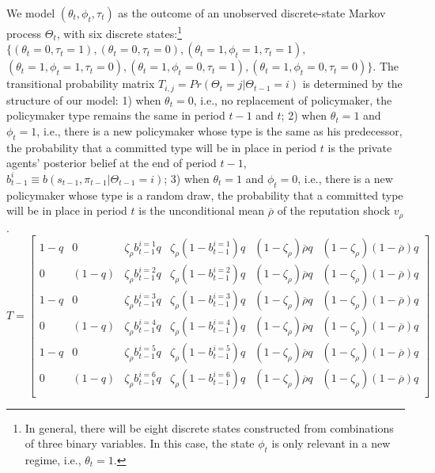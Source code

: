 \documentclass[12pt,letter,leqno]{article}
\theoremstyle{asn}
\theoremstyle{lem}
\theoremstyle{slem}
\theoremstyle{prop}
\theoremstyle{appprop}
\theoremstyle{rem}
\theoremstyle{defn}
\begin{document}
We model $(\theta_t,\phi_t,\tau_t)$ as the outcome of an unobserved discrete-state Markov process $\Theta_{t}$, with six discrete states:\footnote{In general, there will be eight discrete states constructed from combinations of three binary variables. In this case, the state $\phi_t$ is only relevant in a new regime, i.e., $\theta_t=1$.} $\{(\theta_t=0,\tau_t=1), (\theta_t=0,\tau_t=0), (\theta_t=1,\phi_t=1,\tau_t=1),$
$(\theta_t=1,\phi_t=1,\tau_t=0),(\theta_t=1,\phi_t=0,\tau_t=1),(\theta_t=1,\phi_t=0,\tau_t=0)\}$. The transitional probability matrix $T_{i,j} = Pr(\Theta_t=j|\Theta_{t-1}=i)$ is determined by the structure of our model: 1) when $\theta_t=0$, i.e., no replacement of policymaker, the policymaker type remains the same in period $t-1$ and $t$; 2) when $\theta_t=1$ and $\phi_t=1$, i.e., there is a new policymaker whose type is the same as his predecessor, the probability that a committed type will be in place in period $t$ is the private agents' posterior belief at the end of period $t-1$, $b_{t-1}^{i}\equiv b(s_{t-1},\pi_{t-1}|\Theta_{t-1}=i)$; 3) when $\theta_t=1$ and $\phi_t=0$, i.e., there is a new policymaker whose type is a random draw, the probability that a committed type will be in place in period $t$ is the unconditional mean $\overline{\rho}$ of the reputation shock $v_{\rho}$. 
\begin{equation}\label{app:transmatrix}
T=
\begin{bmatrix}
1-q & 0 & \zeta_\rho b_{t-1}^{i=1} q & \zeta_\rho(1-b_{t-1}^{i=1})q & (1-\zeta_\rho)\overline{\rho}q & (1-\zeta_\rho)(1-\overline{\rho})q\\
0 & (1-q) & \zeta_\rho b_{t-1}^{i=2} q & \zeta_\rho(1-b_{t-1}^{i=2})q  & (1-\zeta_\rho)\overline{\rho}q & (1-\zeta_\rho)(1-\overline{\rho})q \\
1-q & 0 & \zeta_\rho b_{t-1}^{i=3} q & \zeta_\rho(1-b_{t-1}^{i=3})q  & (1-\zeta_\rho)\overline{\rho}q & (1-\zeta_\rho)(1-\overline{\rho})q \\
0 & (1-q) & \zeta_\rho b_{t-1}^{i=4} q & \zeta_\rho(1-b_{t-1}^{i=4})q  & (1-\zeta_\rho)\overline{\rho}q & (1-\zeta_\rho)(1-\overline{\rho})q \\
1-q & 0 & \zeta_\rho b_{t-1}^{i=5} q & \zeta_\rho(1-b_{t-1}^{i=5})q  & (1-\zeta_\rho)\overline{\rho}q & (1-\zeta_\rho)(1-\overline{\rho})q \\
0 & (1-q) & \zeta_\rho b_{t-1}^{i=6} q & \zeta_\rho(1-b_{t-1}^{i=6})q  & (1-\zeta_\rho)\overline{\rho}q & (1-\zeta_\rho)(1-\overline{\rho})q \\
\end{bmatrix}
\end{equation}
\end{document}
